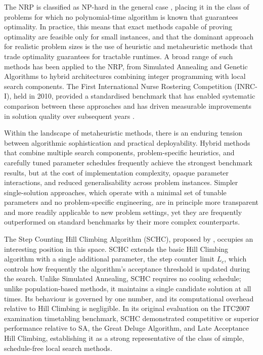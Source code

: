 \documentclass[12pt, a4paper, oneside]{report}
\begin{document}
The NRP is classified as NP-hard in the general case
\citet{Haspeslagh2014}, placing it in the class of problems for
which no polynomial-time algorithm is known that guarantees
optimality. In practice, this means that exact methods capable of
proving optimality are feasible only for small instances, and that
the dominant approach for realistic problem sizes is the use of
heuristic and metaheuristic methods that trade optimality guarantees
for tractable runtimes. A broad range of such methods has been
applied to the NRP, from Simulated Annealing and Genetic Algorithms
to hybrid architectures combining integer programming with local
search components. The First International Nurse Rostering
Competition (INRC-I), held in 2010, provided a standardised
benchmark that has enabled systematic comparison between these
approaches and has driven measurable improvements in solution quality
over subsequent years \citet{Haspeslagh2014}.

Within the landscape of metaheuristic methods, there is an enduring
tension between algorithmic sophistication and practical
deployability. Hybrid methods that combine multiple search
components, problem-specific heuristics, and carefully tuned
parameter schedules frequently achieve the strongest benchmark
results, but at the cost of implementation complexity, opaque
parameter interactions, and reduced generalisability across problem
instances. Simpler single-solution approaches, which operate with a
minimal set of tunable parameters and no problem-specific
engineering, are in principle more transparent and more readily
applicable to new problem settings, yet they are frequently
outperformed on standard benchmarks by their more complex
counterparts.

The Step Counting Hill Climbing Algorithm (SCHC), proposed by
\citet{Bykov2016}, occupies an interesting position in this space.
SCHC extends the basic Hill Climbing algorithm with a single
additional parameter, the step counter limit $L_c$, which controls
how frequently the algorithm's acceptance threshold is updated during
the search. Unlike Simulated Annealing, SCHC requires no cooling
schedule; unlike population-based methods, it maintains a single
candidate solution at all times. Its behaviour is governed by one
number, and its computational overhead relative to Hill Climbing is
negligible. In its original evaluation on the ITC2007 examination
timetabling benchmark, SCHC demonstrated competitive or superior
performance relative to SA, the Great Deluge Algorithm, and Late
Acceptance Hill Climbing, establishing it as a strong representative
of the class of simple, schedule-free local search methods.
\end{document}
